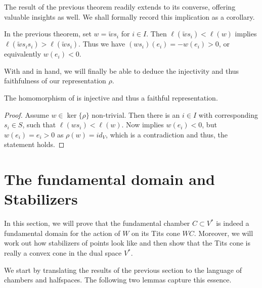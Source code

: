 The result of the previous theorem readily extends to its converse, offering valuable insights as well.
We shall formally record this implication as a corollary.

\begin{corollary}\label{cor:lengthsmall}
    In the previous theorem, set \(w = \widetilde{w}s_i\) for \(i\in I\).
    Then \(\ell(\widetilde{w}s_i) < \ell(w)\) implies \(\ell(\widetilde{w}s_is_i) > \ell(\widetilde{w}s_i)\).
    Thus we have \((ws_i)(e_i) = -w(e_i) > 0\), or equivalently \(w(e_i) < 0\).
\end{corollary}

With  and  in hand, we will finally be able to deduce the injectivity and thus faithfulness of our representation \(\rho\).

\begin{corollary}\label{cor:faithful}
    The homomorphism of  is injective and thus a faithful representation.
\end{corollary}
\begin{proof}
    Assume \(w\in\ker\{\rho\}\) non-trivial. %
    Then there is an \(i\in I\) with corresponding \(s_i\in S\), such that \(\ell(ws_i) < \ell(w)\).
    Now  implies \(w(e_i) < 0\), but \(w(e_i) = e_i > 0\) as \(\rho(w) = id_V\), which is a contradiction and thus, the statement holds.
\end{proof}



\section{The fundamental domain and Stabilizers}

In this section, we will prove that the fundamental chamber \(C\subset V^*\) is indeed a fundamental domain for the action of \(W\) on its Tits cone \(WC\).
Moreover, we will work out how stabilizers of points look like and then show that the Tits cone is really a convex cone in the dual space \(V^*\).

We start by translating the results of the previous section to the language of chambers and halfspaces.
The following two lemmas capture this essence.

